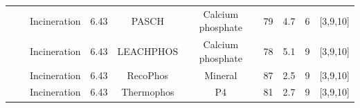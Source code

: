 \documentclass[authoryear]{elsarticle}
\begin{document}
\begin{table}[h]
{\begin{threeparttable}
\begin{tabular}{@{}cccccccccc@{}}
			&                                                                                                                                                         & Incineration                                                                     & 6.43                                      & PASCH                                                                                    & Calcium phosphate                                                                 & 79                                                                                    & 4.7                                  & 6                                                            &     [3,9,10]     \\
			&                                                                                                                                                         & Incineration                                                                     & 6.43                                      & LEACHPHOS                                                                                & Calcium phosphate                                                                 & 78                                                                                    & 5.1                                  & 9                                                            &      [3,9,10]    \\
			&                                                                                                                                                         & Incineration                                                                     & 6.43                                      & RecoPhos                                                                                 & Mineral                                                                           & 87                                                                                    & 2.5                                  & 9                                                            &     [3,9,10]     \\
			&                                                                                                                                                         & Incineration                                                                     & 6.43                                      & Thermophos                                                                               & P4                                                                                & 81                                                                                    & 2.7                                  & 9                                                            &     [3,9,10]     \\ 

\end{tabular}
\end{threeparttable}}
\end{table}
\end{document}
